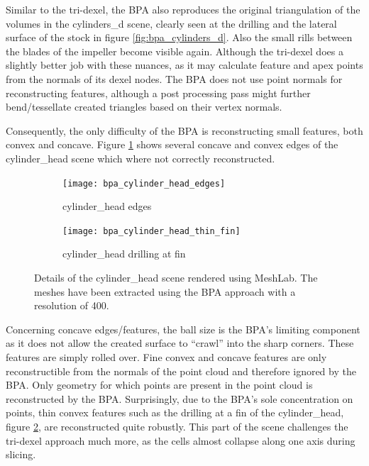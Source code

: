 Similar to the tri-dexel, the BPA also reproduces the original triangulation of the volumes in the cylinders\_d scene, clearly seen at the drilling and the lateral surface of the stock in figure \ref{fig:bpa_cylinders_d}.
Also the small rills between the blades of the impeller become visible again.
Although the tri-dexel does a slightly better job with these nuances, as it may calculate feature and apex points from the normals of its dexel nodes.
The BPA does not use point normals for reconstructing features, although a post processing pass might \eg further bend/tessellate created triangles based on their vertex normals.

Consequently, the only difficulty of the BPA is reconstructing small features, both convex and concave.
Figure \ref{fig:bpa_cylinder_head_edges} shows several concave and convex edges of the cylinder\_head scene which where not correctly reconstructed.
%
\begin{figure}
	\centering
	\begin{subfigure}[b]{0.49\textwidth}
		\centering
		\texttt{[image: bpa\_cylinder\_head\_edges]}
		\caption{cylinder\_head edges}
		\label{fig:bpa_cylinder_head_edges}
	\end{subfigure}
	\begin{subfigure}[b]{0.49\textwidth}
		\centering
		\texttt{[image: bpa\_cylinder\_head\_thin\_fin]}
		\caption{cylinder\_head drilling at fin}
		\label{fig:bpa_cylinder_head_thin_fin}
	\end{subfigure}
	\caption{
		Details of the cylinder\_head scene rendered using MeshLab.
		The meshes have been extracted using the BPA approach with a resolution of 400.
	}
	\label{fig:bpa_cylinder_head_details}
\end{figure}
%
Concerning concave edges/features, the ball size is the BPA's limiting component as it does not allow the created surface to \enquote{crawl} into the sharp corners.
These features are simply rolled over.
Fine convex and concave features are only reconstructible from the normals of the point cloud and therefore ignored by the BPA.
Only geometry for which points are present in the point cloud is reconstructed by the BPA.
Surprisingly, due to the BPA's sole concentration on points, thin convex features such as the drilling at a fin of the cylinder\_head, \cf figure \ref{fig:bpa_cylinder_head_thin_fin}, are reconstructed quite robustly.
This part of the scene challenges the tri-dexel approach much more, as the cells almost collapse along one axis during slicing.

